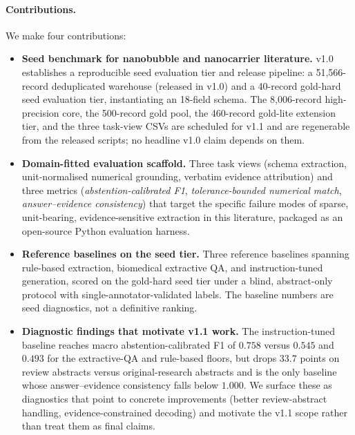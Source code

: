 \documentclass{article}
\begin{document}
\paragraph{Contributions.}
We make four contributions:

\begin{itemize}\itemsep0pt

\item \textbf{Seed benchmark for nanobubble and nanocarrier literature.}
v1.0 establishes a reproducible seed evaluation tier and release pipeline: a 51{,}566-record deduplicated warehouse (released in v1.0) and a 40-record gold-hard seed evaluation tier, instantiating an 18-field schema. The 8{,}006-record high-precision core, the 500-record gold pool, the 460-record gold-lite extension tier, and the three task-view CSVs are scheduled for v1.1 and are regenerable from the released scripts; no headline v1.0 claim depends on them.

\item \textbf{Domain-fitted evaluation scaffold.}
Three task views (schema extraction, unit-normalised numerical grounding, verbatim evidence attribution) and three metrics (\emph{abstention-calibrated F1}, \emph{tolerance-bounded numerical match}, \emph{answer--evidence consistency}) that target the specific failure modes of sparse, unit-bearing, evidence-sensitive extraction in this literature, packaged as an open-source Python evaluation harness.

\item \textbf{Reference baselines on the seed tier.}
Three reference baselines spanning rule-based extraction, biomedical extractive QA, and instruction-tuned generation, scored on the gold-hard seed tier under a blind, abstract-only protocol with single-annotator-validated labels. The baseline numbers are seed diagnostics, not a definitive ranking.

\item \textbf{Diagnostic findings that motivate v1.1 work.}
The instruction-tuned baseline reaches macro abstention-calibrated F1 of $0.758$ versus $0.545$ and $0.493$ for the extractive-QA and rule-based floors, but drops $33.7$ points on review abstracts versus original-research abstracts and is the only baseline whose answer--evidence consistency falls below $1.000$. We surface these as diagnostics that point to concrete improvements (better review-abstract handling, evidence-constrained decoding) and motivate the v1.1 scope rather than treat them as final claims.

\end{itemize}
\end{document}
